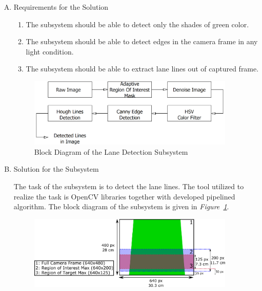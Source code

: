 \documentclass[a4paper,12pt]{article}
\begin{document}
\begin{enumerate}[A.]

\item {Requirements for the Solution}




\begin{enumerate}[1)]

\item The subsystem should be able to detect only the shades of green color.

\item The subsystem should be able to detect edges in the camera frame in any light condition.

\item The subsystem should be able to extract lane lines out of captured frame.


\end{enumerate}




\begin{figure}[b]

\includegraphics[width=0.93\textwidth,center]{images/vModels/laneDetection_subsystem}

\caption{Block Diagram of the Lane Detection Subsystem}\label{fig:lane_detection_subsystem}

\end{figure}




\item {Solution for the Subsystem}


The task of the subsystem is to detect the lane lines. The tool utilized to realize the task is OpenCV libraries together with developed pipelined algorithm. The block diagram of the subsystem is given in \textit{Figure~\ref{fig:lane_detection_subsystem}}.
\begin{figure}[t]
	
	\includegraphics[width=0.93\textwidth,center]{images/ROT_ROI/explanation_ROI_ROT}
	

\end{figure}
\end{enumerate}
\end{document}
